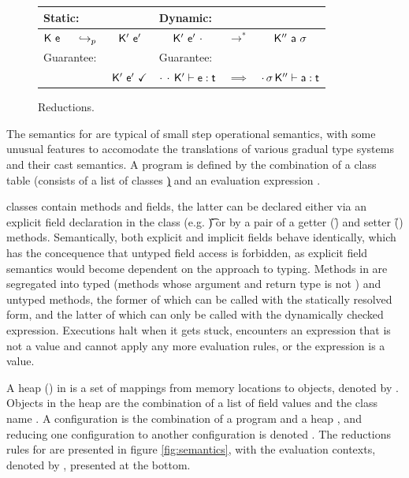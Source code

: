 \documentclass[a4paper,USenglish]{tex/lipics-v2016}
\begin{document}
\begin{figure}[!h]
\begin{tabular}{|ccc|ccc|}
\hline
\multicolumn{3}{|l|}{Static:} & \multicolumn{3}{l|}{Dynamic:}\\
\hline
${\sf{K}}~{\sf{e}}$ & $\underline{} ~\hookrightarrow_p~$ & ${{\sf{K'}}}~{{{\sf{e'}}}}$ & 
${{\sf{K'}}}~{{{\sf{e'}}}}~\cdot$ & $\longrightarrow^*$ & ${{\sf{K''}}}~{\sf{a}}~\sigma$ \\
\hline
\multicolumn{3}{|l|}{Guarantee:} & \multicolumn{3}{l|}{Guarantee:}\\
\hline
&& ${{\sf{K'}}}~{{{\sf{e'}}}}~\checkmark$ & 
$\EnvType {\cdot}{\cdot}\Kp\e\t$ & $\implies$ & 
$\EnvType {\cdot}{\s}\Kpp\a\t$ \\\hline
\end{tabular}
\caption{\kafka Reductions.}\label{redu}
\end{figure}

The semantics for \kafka are typical of small step operational semantics, 
with some unusual features to accomodate the translations of various
gradual type systems and their cast semantics. A \kafka program is defined 
by the combination of a class table \K (consists of a list of classes \k)
and an evaluation expression \e. 

\kafka classes contain methods and fields, the latter can be declared 
either via an explicit field declaration in the class
(e.g. \HT\f\t) or by a pair of a getter (\Get\this\f) and setter 
(\Set\this\f\x) methods. Semantically, both explicit and implicit fields behave 
identically, which has the concequence that untyped field access is forbidden, 
as explicit field semantics would become dependent on the approach to typing. 
Methods in \kafka are segregated into typed (methods whose argument and
return type is not \any) and untyped methods, the former of which can be 
called with the statically resolved \Call\e\m\e form, and the latter of
which can only be called with the dynamically checked \DynCall\e\m\e 
expression. Executions halt when it gets stuck, encounters an expression that is 
not a value and cannot apply any more evaluation rules, or the expression is a value.

A heap (\s) in \kafka is a set of mappings from memory locations to objects,
denoted by \Map\s{\Bind\a{\obj\C{\b\a}}}. Objects in the heap are the 
combination of a list of field values \a and the class name \C.
A configuration is the combination of a program \K\e and a heap \s, 
and reducing one configuration \K\e\s to another configuration \Kp\ep\sp 
is denoted \Reduce\K\e\s\Kp\ep\sp. The reductions rules for \kafka are presented 
in figure \ref{fig:semantics}, with the evaluation contexts, denoted by \EE, presented 
at the bottom.
\end{document}
